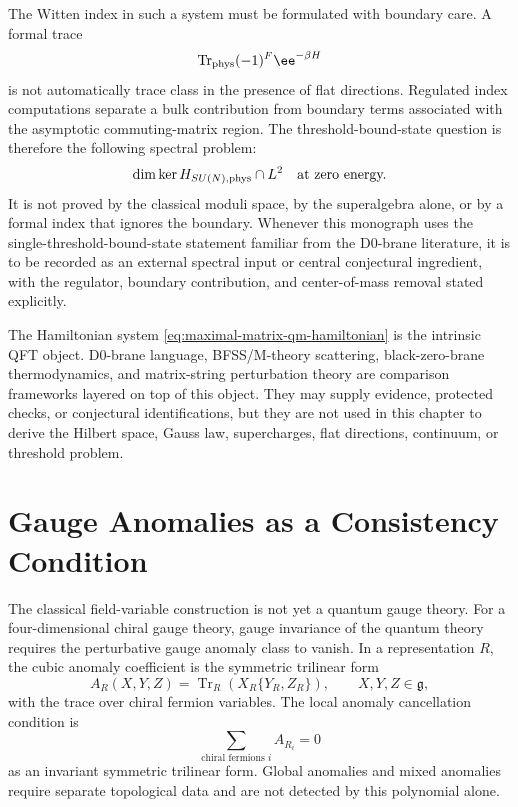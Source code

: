 The Witten index in such a system must be formulated with boundary care.  A
formal trace
\[
  \operatorname{Tr}_{\rm phys}(-1)^F\ee^{-\beta H}
\]
is not automatically trace class in the presence of flat directions.  Regulated
index computations separate a bulk contribution from boundary terms associated
with the asymptotic commuting-matrix region.  The threshold-bound-state
question is therefore the following spectral problem:
\[
  \dim \ker H_{SU(N),{\rm phys}}\cap L^2
  \quad\text{at zero energy.}
\]
It is not proved by the classical moduli space, by the superalgebra alone, or
by a formal index that ignores the boundary.  Whenever this monograph uses the
single-threshold-bound-state statement familiar from the D0-brane literature,
it is to be recorded as an external spectral input or central conjectural
ingredient, with the regulator, boundary contribution, and center-of-mass
removal stated explicitly.

\begin{remark}
\label{rem:matrix-qm-string-comparison-status}
The Hamiltonian system
\eqref{eq:maximal-matrix-qm-hamiltonian} is the intrinsic QFT object.  D0-brane
language, BFSS/M-theory scattering, black-zero-brane thermodynamics, and
matrix-string perturbation theory are comparison frameworks layered on top of
this object.  They may supply evidence, protected checks, or conjectural
identifications, but they are not used in this chapter to derive the Hilbert
space, Gauss law, supercharges, flat directions, continuum, or threshold
problem.
\end{remark}

\section{Gauge Anomalies as a Consistency Condition}

The classical field-variable construction is not yet a quantum gauge theory.
For a four-dimensional chiral gauge theory, gauge invariance of the quantum
theory requires the perturbative gauge anomaly class to vanish.  In a
representation \(R\), the cubic anomaly coefficient is the symmetric
trilinear form
\[
  A_R(X,Y,Z)
  =
  \operatorname{Tr}_R\!\left(X_R\{Y_R,Z_R\}\right),
  \qquad X,Y,Z\in\mathfrak g ,
\]
with the trace over chiral fermion variables.  The local anomaly cancellation
condition is
\[
  \sum_{\text{chiral fermions }i} A_{R_i}=0
\]
as an invariant symmetric trilinear form.  Global anomalies and mixed
anomalies require separate topological data and are not detected by this
polynomial alone.

